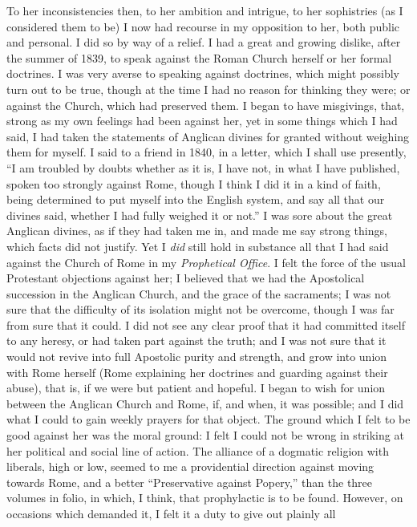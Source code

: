 To her inconsistencies then, to her ambition and intrigue,
to her sophistries (as I considered them to be) I now
had recourse in my opposition to her, both public and personal. I did so
by way of a relief. I had a great and growing dislike, after the summer
of 1839, to speak against the Roman Church herself or her formal
doctrines. I was very averse to speaking against doctrines,
which might possibly turn out to be true, though at the time I had no
reason for thinking they were; or against the Church, which had
preserved them. I began to have misgivings, that, strong as my own
feelings had been against her, yet in some things which I had said, I
had taken the statements of Anglican divines for granted without
weighing them for myself. I said to a friend in 1840, in a letter, which
I shall use presently, ``I am troubled by doubts whether as it is, I
have not, in what I have published, spoken too strongly against Rome,
though I think I did it in a kind of faith, being determined to put
myself into the English system, and say all that our divines said,
whether I had fully weighed it or not.'' I was sore about the great
Anglican divines, as if they had taken me in, and made me say strong
things, which facts did not justify. Yet I \emph{did} still hold in substance
all that I had said against the Church of Rome in my \emph{Prophetical
Office}.
I felt the force of the usual Protestant objections against her; I
believed that we had the Apostolical succession in the Anglican Church,
and the grace of the sacraments; I was not sure that the difficulty of
its isolation might not be overcome, though I was far from sure that it
could. I did not see any clear proof that it had committed itself
to any heresy, or had taken part against the truth; and I was not sure
that it would not revive into full Apostolic purity and strength, and
grow into union with Rome herself (Rome explaining her doctrines and
guarding against their abuse), that is, if we were but patient and
hopeful. I began to wish for union between the Anglican Church and
Rome, if, and when, it was possible; and I did what I could to gain
weekly prayers for that object. The ground which I felt to be
good against her was the moral ground: I felt I could not be wrong in
striking at her political and social line of action. The alliance of a
dogmatic religion with liberals, high or low, seemed to me a
providential direction against moving towards Rome, and a better
``Preservative against Popery,'' than the three volumes in folio, in which, I think, that prophylactic is to be found. However,
on occasions which demanded it, I felt it a duty to give out plainly all
